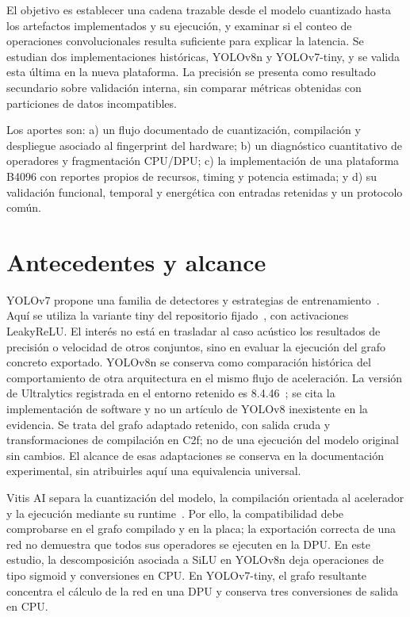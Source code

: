 \documentclass[10pt,conference,a4paper]{elektron}
\begin{document}
El objetivo es establecer una cadena trazable desde el modelo cuantizado hasta los artefactos implementados y su ejecución, y examinar si el conteo de operaciones convolucionales resulta suficiente para explicar la latencia. Se estudian dos implementaciones históricas, YOLOv8n y YOLOv7-tiny, y se valida esta última en la nueva plataforma. La precisión se presenta como resultado secundario sobre validación interna, sin comparar métricas obtenidas con particiones de datos incompatibles.

Los aportes son: a) un flujo documentado de cuantización, compilación y despliegue asociado al fingerprint del hardware; b) un diagnóstico cuantitativo de operadores y fragmentación CPU/DPU; c) la implementación de una plataforma B4096 con reportes propios de recursos, timing y potencia estimada; y d) su validación funcional, temporal y energética con entradas retenidas y un protocolo común.

\section{Antecedentes y alcance}
YOLOv7 propone una familia de detectores y estrategias de entrenamiento~\cite{wang2023yolov7}. Aquí se utiliza la variante tiny del repositorio fijado~\cite{yolov7repo}, con activaciones LeakyReLU. El interés no está en trasladar al caso acústico los resultados de precisión o velocidad de otros conjuntos, sino en evaluar la ejecución del grafo concreto exportado. YOLOv8n se conserva como comparación histórica del comportamiento de otra arquitectura en el mismo flujo de aceleración. La versión de Ultralytics registrada en el entorno retenido es 8.4.46~\cite{ultralytics}; se cita la implementación de software y no un artículo de YOLOv8 inexistente en la evidencia. Se trata del grafo adaptado retenido, con salida cruda y transformaciones de compilación en C2f; no de una ejecución del modelo original sin cambios. El alcance de esas adaptaciones se conserva en la documentación experimental, sin atribuirles aquí una equivalencia universal.

Vitis AI separa la cuantización del modelo, la compilación orientada al acelerador y la ejecución mediante su runtime~\cite{vitisai}. Por ello, la compatibilidad debe comprobarse en el grafo compilado y en la placa; la exportación correcta de una red no demuestra que todos sus operadores se ejecuten en la DPU. En este estudio, la descomposición asociada a SiLU en YOLOv8n deja operaciones de tipo sigmoid y conversiones en CPU. En YOLOv7-tiny, el grafo resultante concentra el cálculo de la red en una DPU y conserva tres conversiones de salida en CPU.
\end{document}
